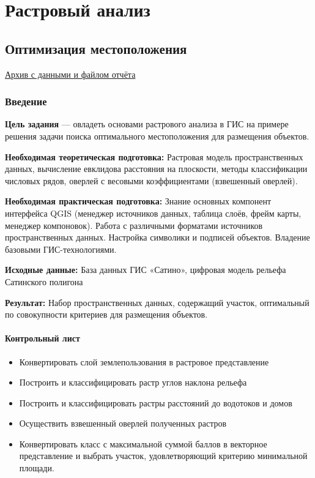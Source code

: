\documentclass[
  12pt,
]{book}
\providecommand{\tightlist}{%
  \setlength{\itemsep}{0pt}\setlength{\parskip}{0pt}}
\begin{document}
\hypertarget{part-ux440ux430ux441ux442ux440ux43eux432ux44bux439-ux430ux43dux430ux43bux438ux437}{%
\part{Растровый анализ}\label{part-ux440ux430ux441ux442ux440ux43eux432ux44bux439-ux430ux43dux430ux43bux438ux437}}

\hypertarget{weighted-overlay}{%
\chapter{Оптимизация местоположения}\label{weighted-overlay}}

\href{https://1drv.ms/u/s!AmtmZDq3JgxHgZwUYSXODVsWhT8Cog?e=dTJpZD}{Архив с данными и файлом отчёта}

\hypertarget{weighted-overlay-intro}{%
\section{Введение}\label{weighted-overlay-intro}}

\textbf{Цель задания} --- овладеть основами растрового анализа в ГИС на примере решения задачи поиска оптимального местоположения для размещения объектов.

\textbf{Необходимая теоретическая подготовка:} Растровая модель пространственных данных, вычисление евклидова расстояния на плоскости, методы классификации числовых рядов, оверлей с весовыми коэффициентами (взвешенный оверлей).

\textbf{Необходимая практическая подготовка:} Знание основных компонент интерфейса QGIS (менеджер источников данных, таблица слоёв, фрейм карты, менеджер компоновок). Работа с различными форматами источников пространственных данных. Настройка символики и подписей объектов. Владение базовыми ГИС-технологиями.

\textbf{Исходные данные:} База данных ГИС «Сатино», цифровая модель рельефа Сатинского полигона

\textbf{Результат:} Набор пространственных данных, содержащий участок, оптимальный по совокупности критериев для размещения объектов.

\hypertarget{weighted-overlay-control}{%
\subsection{Контрольный лист}\label{weighted-overlay-control}}

\begin{itemize}
\tightlist
\item
  Конвертировать слой землепользования в растровое представление
\item
  Построить и классифицировать растр углов наклона рельефа
\item
  Построить и классифицировать растры расстояний до водотоков и домов
\item
  Осуществить взвешенный оверлей полученных растров
\item
  Конвертировать класс с максимальной суммой баллов в векторное представление и выбрать участок, удовлетворяющий критерию минимальной площади.
\end{itemize}
\end{document}
